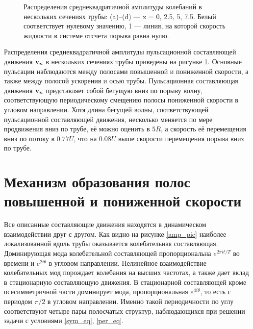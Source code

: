 \begin{figure}[h]
\caption{Распределения среднеквадратичной амплитуды колебаний в нескольких сечениях трубы: (a)--(d) --- x = 0, 2.5, 5, 7.5. Белый соответствует нулевому значению, 1 --- линия, на которой скорость жидкости в системе отсчета порыва равна нулю.}
\label{puls_cs_pic}
\end{figure}

Распределения среднеквадратичной амплитуды пульсационной составляющей движения $\mathbf{v}_n$ в нескольких сечениях трубы приведены на рисунке \ref{puls_cs_pic}. Основные пульсации наблюдаются между полосами повышенной и пониженной скорости, а также между полосой ускорения и осью трубы. Пульсационная составляющая движения $\mathbf{v}_n$ представляет собой бегущую вниз по порыву волну, соответствующую периодическому смещению полосы пониженной скорости в угловом направлении. Хотя длина бегущей волны, соответствующей пульсационной составляющей движения, несколько меняется по мере продвижения вниз по трубе, её можно оценить в $5R$, а скорость её перемещения вниз по потоку в $0.77U$, что на $0.08U$ выше скорости перемещения порыва вниз по трубе.  


\section{Механизм образования полос повышенной и пониженной скорости} 

Все описанные составляющие движения находятся в динамическом взаимодействии друг с другом. Как видно на рисунке \ref{amp_pic} наиболее локализованной вдоль трубы оказывается колебательная составляющая. Доминирующая мода колебательной составляющей пропорциональна $e^{2\pi it/T}$ во времени и $e^{2i\theta}$ в угловом направлении. Нелинейное взаимодействие колебательных мод порождает колебания на высших частотах, а также дает вклад в стационарную составляющую движения. В стационарной составляющей кроме осесимметричной части доминирует мода, пропорциональная $e^{4i\theta}$, то есть с периодом $\pi/2$ в угловом направлении. Именно такой периодичности по углу соответствуют четыре пары полосчатых структур, наблюдающихся при решении задачи с условиями \eqref{sym_eq}, \eqref{per_eq}.

